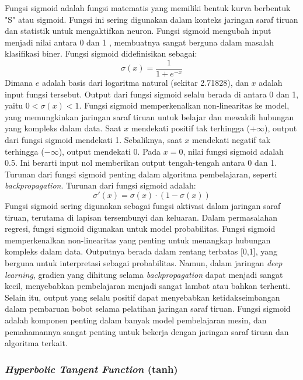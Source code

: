Fungsi sigmoid adalah fungsi matematis yang memiliki bentuk kurva berbentuk "S" atau sigmoid. Fungsi ini sering digunakan dalam konteks jaringan saraf tiruan dan statistik untuk mengaktifkan neuron. Fungsi sigmoid mengubah input menjadi nilai antara 0 dan 1 \cite{Kelleher2019-cj}, membuatnya sangat berguna dalam masalah klasifikasi biner. Fungsi sigmoid didefinisikan sebagai:
\begin{equation}
\sigma(x) = \frac{1}{1 + e^{-x}}
\end{equation}
Dimana \( e \) adalah basis dari logaritma natural (sekitar 2.71828), dan \( x \) adalah input fungsi tersebut. Output dari fungsi sigmoid selalu berada di antara 0 dan 1, yaitu \( 0 < \sigma(x) < 1 \). Fungsi sigmoid memperkenalkan non-linearitas ke model, yang memungkinkan jaringan saraf tiruan untuk belajar dan mewakili hubungan yang kompleks dalam data. Saat \( x \) mendekati positif tak terhingga (\( +\infty \)), output dari fungsi sigmoid mendekati 1. Sebaliknya, saat \( x \) mendekati negatif tak terhingga (\( -\infty \)), output mendekati 0. Pada \( x = 0 \), nilai fungsi sigmoid adalah 0.5. Ini berarti input nol memberikan output tengah-tengah antara 0 dan 1. Turunan dari fungsi sigmoid penting dalam algoritma pembelajaran, seperti \textit{backpropagation}. Turunan dari fungsi sigmoid adalah:
\begin{equation}
    \sigma'(x) = \sigma(x) \cdot (1 - \sigma(x))
\end{equation}
Fungsi sigmoid sering digunakan sebagai fungsi aktivasi dalam jaringan saraf tiruan, terutama di lapisan tersembunyi dan keluaran. Dalam permasalahan regresi, fungsi sigmoid digunakan untuk model probabilitas. Fungsi sigmoid memperkenalkan non-linearitas yang penting untuk menangkap hubungan kompleks dalam data. Outputnya berada dalam rentang terbatas [0,1], yang berguna untuk interpretasi sebagai probabilitas. Namun, dalam jaringan \textit{deep learning}, gradien yang dihitung selama \textit{backpropagation} dapat menjadi sangat kecil, menyebabkan pembelajaran menjadi sangat lambat atau bahkan terhenti. Selain itu, output yang selalu positif dapat menyebabkan ketidakseimbangan dalam pembaruan bobot selama pelatihan jaringan saraf tiruan. Fungsi sigmoid adalah komponen penting dalam banyak model pembelajaran mesin, dan pemahamannya sangat penting untuk bekerja dengan jaringan saraf tiruan dan algoritma terkait.

\subsubsection{\textit{Hyperbolic Tangent Function} (tanh)
}

